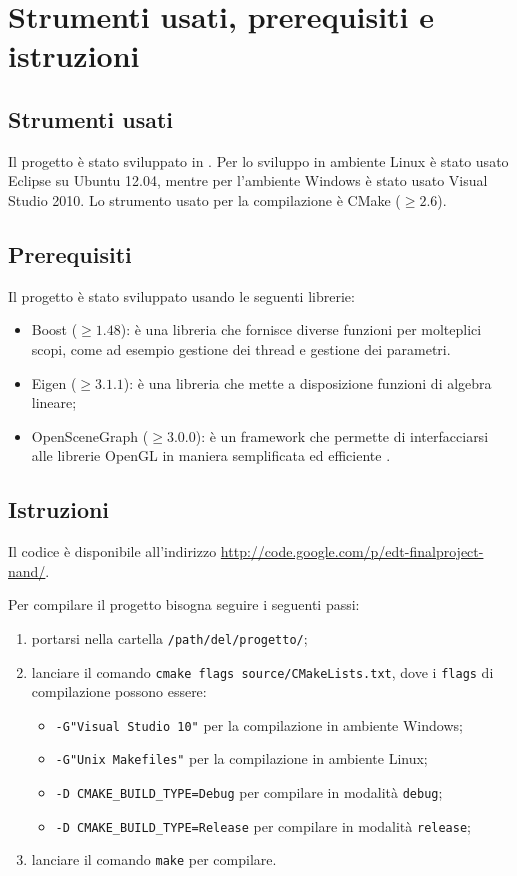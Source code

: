 \section{Strumenti usati, prerequisiti e istruzioni}
\subsection{Strumenti usati}
Il progetto è stato sviluppato in \cpp. Per lo sviluppo in ambiente Linux è stato usato Eclipse su Ubuntu 12.04, mentre per l'ambiente Windows è stato usato Visual Studio 2010. Lo strumento usato per la compilazione è CMake ($\geq 2.6$).

\subsection{Prerequisiti}
Il progetto è stato sviluppato usando le seguenti librerie:
\begin{itemize}[noitemsep]
  \item Boost ($\geq 1.48$): è una libreria che fornisce diverse funzioni per molteplici scopi, come ad esempio gestione dei thread e gestione dei parametri.
  \item Eigen ($\geq 3.1.1$): è una libreria che mette a disposizione funzioni di algebra lineare;
  \item OpenSceneGraph ($\geq 3.0.0$): è un framework che permette di interfacciarsi alle librerie OpenGL in maniera semplificata ed efficiente \cite{osgbeginner}\cite{osgcookbook}.
\end{itemize}

\subsection{Istruzioni}
Il codice è disponibile all'indirizzo \url{http://code.google.com/p/edt-finalproject-nand/}.

Per compilare il progetto bisogna seguire i seguenti passi:
\begin{enumerate}
  \item portarsi nella cartella \verb!/path/del/progetto/!;
  \item lanciare il comando \verb!cmake flags source/CMakeLists.txt!, dove i \verb!flags! di compilazione possono essere:
    \begin{itemize}[noitemsep]
      \item \verb!-G"Visual Studio 10"! per la compilazione in ambiente Windows;
      \item \verb!-G"Unix Makefiles"! per la compilazione in ambiente Linux;
    \end{itemize}
    \begin{itemize}[noitemsep]
      \item \verb!-D CMAKE_BUILD_TYPE=Debug! per compilare in modalità \verb!debug!;
      \item \verb!-D CMAKE_BUILD_TYPE=Release! per compilare in modalità \verb!release!;
    \end{itemize}
  \item lanciare il comando \verb!make! per compilare.
\end{enumerate}


